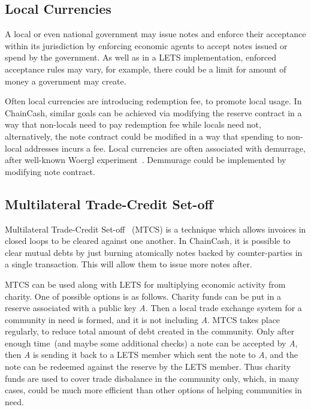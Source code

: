 \documentclass{llncs}   %
\newcommand{\cc}{ChainCash}
\begin{document}
\subsection{Local Currencies}

A local or even national government may issue notes and enforce their acceptance within its jurisdiction by enforcing economic agents to accept notes issued or spend by the government. As well as in a LETS implementation, enforced acceptance rules may vary, for example, there
could be a limit for amount of money a government may create.

Often local currencies are introducing redemption fee, to promote local usage. In \cc{}, similar goals can be achieved via modifying the reserve contract in a way that non-locals need to pay redemption fee while locals need not, alternatively, the note contract could be modified in a way that spending to non-local addresses incurs a fee. Local currencies are often associated with demurrage, after well-known Woergl experiment~\cite{unterguggenbercer1934end}. Demmurage could be implemented by modifying note contract.

\subsection{Multilateral Trade-Credit Set-off}
\label{mtcs}

Multilateral Trade-Credit Set-off~\cite{bottazzi2024multilateral} (MTCS) is a technique which allows invoices in closed loops to be cleared against one another.
In \cc{}, it is possible to clear mutual debts by just burning atomically notes backed by counter-parties in a single
transaction. This will allow them to issue more notes after.

MTCS can be used along with LETS for multiplying economic activity from charity. One of possible options is as follows.
Charity funds can be put in a reserve associated with a public key {\em A}. Then a local trade exchange system for a community
in need is formed, and it is not including {\em A}. MTCS takes place regularly, to reduce total amount of debt created in the
community. Only after enough time~(and maybe some additional checks) a note can be accepted by {\em A}, then {\em A} is sending it back to
a LETS member which sent the note to {\em A}, and the note can be redeemed against the reserve by the LETS member. Thus
charity funds are used to cover trade disbalance in the community only, which, in many cases, could be much more efficient
than other options of helping communities in need.
\end{document}
